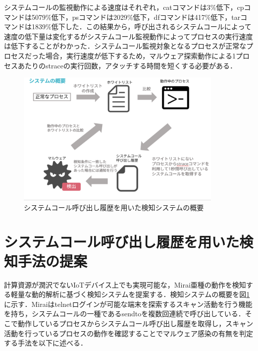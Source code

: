 システムコールの監視動作による速度はそれぞれ，catコマンドは3\%低下，cpコマンドは5079\%低下，psコマンドは2029\%低下，dfコマンドは417\%低下，tarコマンドは1839\%低下した．この結果から，呼び出されるシステムコールによって速度の低下量は変化するがシステムコール監視動作によってプロセスの実行速度は低下することがわかった．システムコール監視対象となるプロセスが正常なプロセスだった場合，実行速度が低下するため，マルウェア探索動作による1プロセスあたりのstraceの実行回数，アタッチする時間を短くする必要がある．




\begin{figure}[h]
   \centering
      \includegraphics[width=100mm]{figures/strace.eps}
  \caption{システムコール呼び出し履歴を用いた検知システムの概要}
  \label{fig:strace}
\end{figure}

\section{システムコール呼び出し履歴を用いた検知手法の提案}
計算資源が潤沢でないIoTデバイス上でも実現可能な，Mirai亜種の動作を検知する軽量な動的解析に基づく検知システムを提案する．検知システムの概要を図\ref{fig:strace}に示す．Miraiはtelnetログインが可能な端末を探索するスキャン活動を行う機能を持ち，システムコールの一種であるsendtoを複数回連続で呼び出している．そこで動作しているプロセスからシステムコール呼び出し履歴を取得し，スキャン活動を行っているプロセスの動作を確認することでマルウェア感染の有無を判定する手法を以下に述べる．

